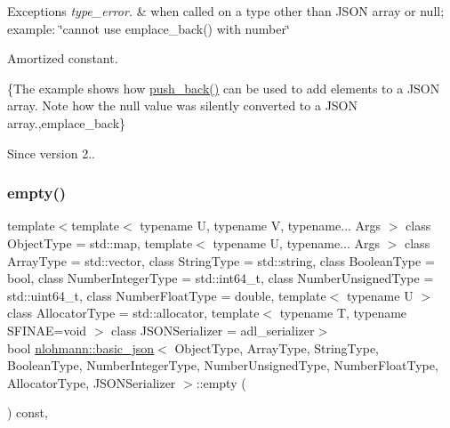 \begin{DoxyExceptions}{Exceptions}
{\em type\+\_\+error.} & when called on a type other than J\+S\+ON array or null; example\+: {\ttfamily \char`\"{}cannot use emplace\+\_\+back() with number\char`\"{}}\\
\hline
\end{DoxyExceptions}
Amortized constant.

\{The example shows how {\ttfamily \mbox{\hyperlink{classnlohmann_1_1basic__json_ac8e523ddc8c2dd7e5d2daf0d49a9c0d7}{push\+\_\+back()}}} can be used to add elements to a J\+S\+ON array. Note how the {\ttfamily null} value was silently converted to a J\+S\+ON array.,emplace\+\_\+back\}

\begin{DoxySince}{Since}
version 2.. 
\end{DoxySince}
\mbox{\label{classnlohmann_1_1basic__json_a1a86d444bfeaa9518d2421aedd74444a}} 
\subsubsection{\texorpdfstring{empty()}{empty()}}
{\footnotesize\ttfamily template$<$template$<$ typename U, typename V, typename... Args $>$ class Object\+Type = std\+::map, template$<$ typename U, typename... Args $>$ class Array\+Type = std\+::vector, class String\+Type  = std\+::string, class Boolean\+Type  = bool, class Number\+Integer\+Type  = std\+::int64\+\_\+t, class Number\+Unsigned\+Type  = std\+::uint64\+\_\+t, class Number\+Float\+Type  = double, template$<$ typename U $>$ class Allocator\+Type = std\+::allocator, template$<$ typename T, typename S\+F\+I\+N\+A\+E=void $>$ class J\+S\+O\+N\+Serializer = adl\+\_\+serializer$>$ \\
bool \mbox{\hyperlink{classnlohmann_1_1basic__json}{nlohmann\+::basic\+\_\+json}}$<$ Object\+Type, Array\+Type, String\+Type, Boolean\+Type, Number\+Integer\+Type, Number\+Unsigned\+Type, Number\+Float\+Type, Allocator\+Type, J\+S\+O\+N\+Serializer $>$\+::empty (\begin{DoxyParamCaption}{ }\end{DoxyParamCaption}) const\hspace{0.3cm}{\ttfamily [inline]}, {\ttfamily [noexcept]}}



